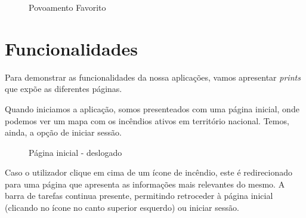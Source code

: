 \documentclass[a4paper,12pt]{scrreprt}
\newcommand{\tab}{
    \hspace{1cm}}
\begin{document}
\begin{figure}[hbt!]
    \centering
    \caption{Povoamento Favorito}
\end{figure}

\section{Funcionalidades}

\tab Para demonstrar as funcionalidades da nossa aplicações, vamos apresentar \textit{prints} que expõe as diferentes páginas.

\tab Quando iniciamos a aplicação, somos presenteados com uma página inicial, onde podemos ver um mapa com os incêndios ativos em território nacional. Temos, ainda, a opção de iniciar sessão.

\begin{figure}[H]
    \centering
    \caption{Página inicial - deslogado}
\end{figure}
\clearpage
\tab Caso o utilizador clique em cima de um ícone de incêndio, este é redirecionado para uma página que apresenta as informações mais relevantes do mesmo. A barra de tarefas continua presente, permitindo retroceder à página inicial (clicando no ícone no canto superior esquerdo) ou iniciar sessão.
\end{document}
